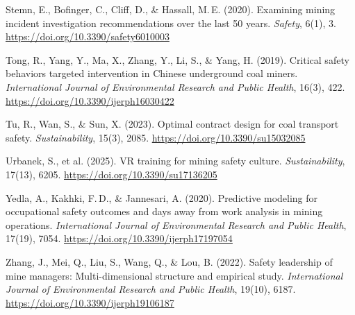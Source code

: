 \documentclass[12pt,a4paper]{article}
\begin{document}
Stemn, E., Bofinger, C., Cliff, D., \& Hassall, M.\,E. (2020). Examining mining incident investigation recommendations over the last 50 years. \textit{Safety}, 6(1), 3. \url{https://doi.org/10.3390/safety6010003}

Tong, R., Yang, Y., Ma, X., Zhang, Y., Li, S., \& Yang, H. (2019). Critical safety behaviors targeted intervention in Chinese underground coal miners. \textit{International Journal of Environmental Research and Public Health}, 16(3), 422. \url{https://doi.org/10.3390/ijerph16030422}

Tu, R., Wan, S., \& Sun, X. (2023). Optimal contract design for coal transport safety. \textit{Sustainability}, 15(3), 2085. \url{https://doi.org/10.3390/su15032085}

Urbanek, S., et al. (2025). VR training for mining safety culture. \textit{Sustainability}, 17(13), 6205. \url{https://doi.org/10.3390/su17136205}

Yedla, A., Kakhki, F.\,D., \& Jannesari, A. (2020). Predictive modeling for occupational safety outcomes and days away from work analysis in mining operations. \textit{International Journal of Environmental Research and Public Health}, 17(19), 7054. \url{https://doi.org/10.3390/ijerph17197054}

Zhang, J., Mei, Q., Liu, S., Wang, Q., \& Lou, B. (2022). Safety leadership of mine managers: Multi-dimensional structure and empirical study. \textit{International Journal of Environmental Research and Public Health}, 19(10), 6187. \url{https://doi.org/10.3390/ijerph19106187}

\endgroup
\end{document}
